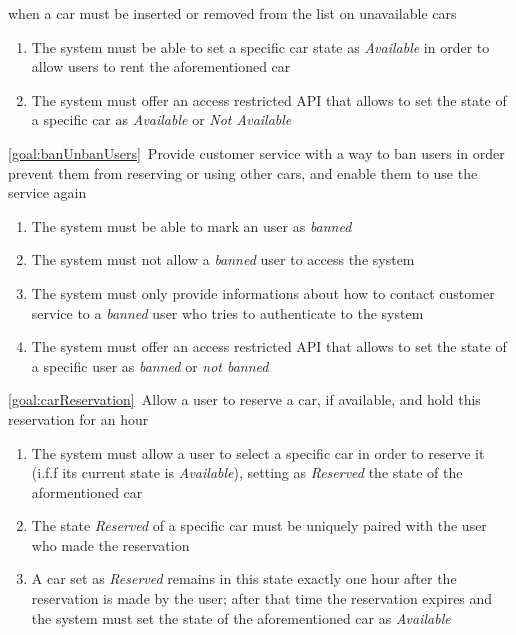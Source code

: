 \begin{description}
		when a car must be inserted or removed from the list on unavailable cars
			\begin{enumerate}[resume*]
   				\item The system must be able to set a specific car state as \textit{Available} in order to
   				allow users to rent the aforementioned car
   				\item The system must offer an access restricted API that allows to set the state of a
   				specific car as \textit{Available} or \textit{Not Available}
  			\end{enumerate}
  		\item \ref{goal:banUnbanUsers}\ Provide customer service with a way to ban users in order
  		prevent them from reserving or using other cars, and enable them to use the service again
  			\begin{enumerate}[resume*]
  				\item The system must be able to mark an user as \textit{banned}
  				\item The system must not allow a \textit{banned} user to access the system
   				\item The system must only provide informations about how to contact customer service
   				to a \textit{banned} user who tries to authenticate to the system
   				\item The system must offer an access restricted API that allows to set the state of a
   				specific user as \textit{banned} or \textit{not banned}
   			\end{enumerate}
 	  	\item \ref{goal:carReservation}\ Allow a user to reserve a car, if available, and hold this
 	  	reservation for an hour
 	  		\begin{enumerate}[resume*]
 	  			\item The system must allow a user to select a specific car in order to reserve it 
 	  			(i.f.f its current state is \textit{Available}), setting as \textit{Reserved} the state of the
 	  			aformentioned car
 	  			\item The state \textit{Reserved} of a specific car must be uniquely paired with the user
 	  			who made the reservation
 	  			\item A car set as \textit{Reserved} remains in this state exactly one hour after the
 	  			reservation is made by the user; after that time the reservation expires and the system
 	  			must set the state of the aforementioned car as \textit{Available}
   			\end{enumerate}

\end{description}
